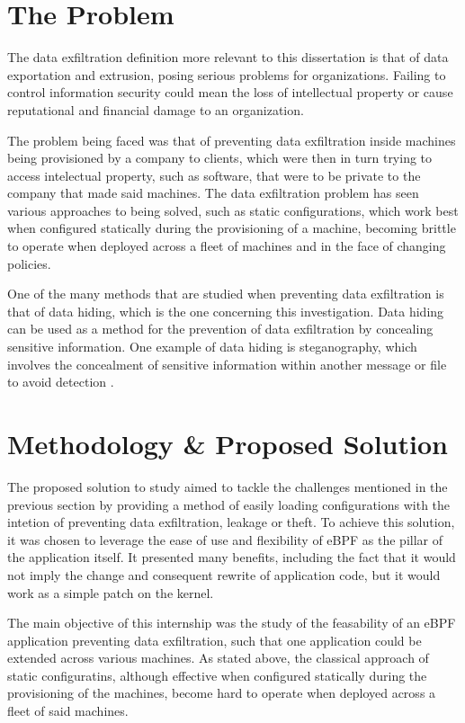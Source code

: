\section{The Problem}
The data exfiltration definition more relevant to this dissertation is that of data exportation and extrusion, posing serious problems for organizations. Failing to control information security could mean the loss of intellectual property or cause reputational and financial damage to an organization.

The problem being faced was that of preventing data exfiltration inside machines being provisioned by a company to clients, which were then in turn trying to access intelectual property, such as software, that were to be private to the company that made said machines.
The data exfiltration problem has seen various approaches to being solved, such as static configurations, which work best when configured statically during the provisioning of a machine, becoming brittle to operate when deployed across a fleet of machines and in the face of changing policies.

One of the many methods that are studied when preventing data exfiltration is that of data hiding, which is the one concerning this investigation. Data hiding can be used as a method for the prevention of data exfiltration by concealing sensitive information. One example of data hiding is steganography, which involves the concealment of sensitive information within another message or file to avoid detection \cite{steg}.


\section{Methodology \& Proposed Solution}
The proposed solution to study aimed to tackle the challenges mentioned in the previous section by providing a method of easily loading configurations with the intetion of preventing data exfiltration, leakage or theft. To achieve this solution, it was chosen to leverage the ease of use and flexibility of eBPF as the pillar of the application itself. It presented many benefits, including the fact that it would not imply the change and consequent rewrite of application code, but it would work as a simple patch on the kernel.

The main objective of this internship was the study of the feasability of an eBPF application preventing data exfiltration, such that one application could be extended across various machines. As stated above, the classical approach of static configuratins, although effective when configured statically during the provisioning of the machines, become hard to operate when deployed across a fleet of said machines.

